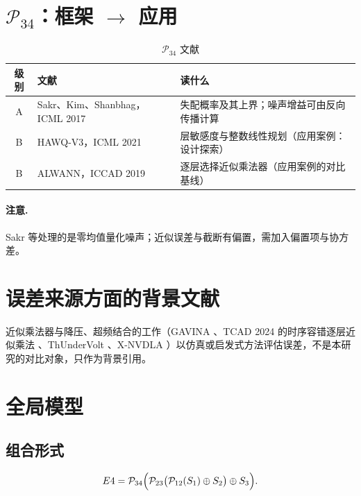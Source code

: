 \documentclass[11pt,a4paper]{ctexart}
\begin{document}
\section{$\mathcal P_{34}$：框架 $\to$ 应用}
\begin{table}[h]
\centering
\small
\begin{tabularx}{\textwidth}{@{}clX@{}}
\toprule
级别 & 文献 & 读什么 \\
\midrule
A & Sakr、Kim、Shanbhag，ICML 2017 \cite{sakr2017} & 失配概率及其上界；噪声增益可由反向传播计算 \\
B & HAWQ-V3，ICML 2021 \cite{hawq} & 层敏感度与整数线性规划（应用案例：设计探索） \\
B & ALWANN，ICCAD 2019 \cite{alwann} & 逐层选择近似乘法器（应用案例的对比基线） \\
\bottomrule
\end{tabularx}
\caption{$\mathcal P_{34}$ 文献}
\end{table}

\paragraph{注意.} Sakr 等处理的是零均值量化噪声；近似误差与截断有偏置，需加入偏置项与协方差。

\section{误差来源方面的背景文献}
近似乘法器与降压、超频结合的工作（GAVINA \cite{gavina}、TCAD 2024 的时序容错逐层近似乘法 \cite{tcad2024}、ThUnderVolt \cite{thundervolt}、X-NVDLA \cite{xnvdla}）以仿真或启发式方法评估误差，不是本研究的对比对象，只作为背景引用。

\section{全局模型}

\subsection{组合形式}
\begin{equation}
E4 = \mathcal P_{34}\Bigl(\mathcal P_{23}\bigl(\mathcal P_{12}(S_1) \oplus S_2\bigr) \oplus S_3\Bigr).
\end{equation}
\end{document}
